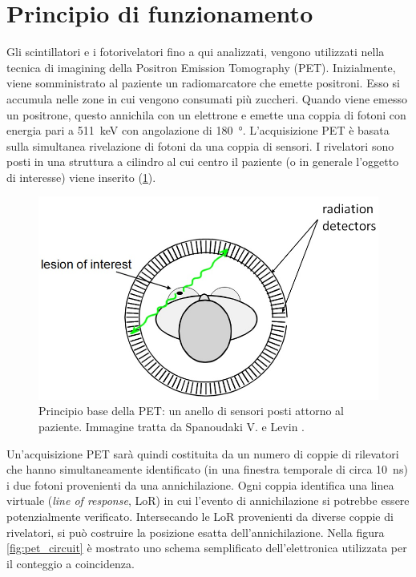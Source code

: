 \section{Principio di funzionamento}
Gli scintillatori e i fotorivelatori fino a qui analizzati, vengono utilizzati nella tecnica di imagining della Positron Emission Tomography (PET). Inizialmente, viene somministrato al paziente un radiomarcatore che emette positroni. Esso si accumula nelle zone in cui vengono consumati più zuccheri. Quando viene emesso un positrone, questo annichila con un elettrone e emette una coppia di fotoni con energia pari a \SI{511}{\kilo\electronvolt} con angolazione di \SI{180}{\degree}. L'acquisizione PET è basata sulla simultanea rivelazione di fotoni da una coppia di sensori. I rivelatori sono posti in una struttura a cilindro al cui centro il paziente (o in generale l'oggetto di interesse) viene inserito (\Fig\ref{fig:pet}).
\begin{figure}[tbh]
	\centering
	\includegraphics[width=0.6\linewidth]{./ImageFiles/PET.jpg}
	\caption{Principio base della PET: un anello di sensori posti attorno al paziente. Immagine tratta da Spanoudaki V. e Levin \cite{Spanoudaki2010}.}
	\label{fig:pet}
\end{figure} 
Un'acquisizione PET sarà quindi costituita da un numero di coppie di rilevatori che hanno simultaneamente identificato (in una finestra temporale di circa \SI{10}{\nano\second}) i due fotoni provenienti da una annichilazione. Ogni coppia identifica una linea virtuale (\textit{line of response}, LoR) in cui l'evento di annichilazione si potrebbe essere potenzialmente verificato. Intersecando le LoR provenienti da diverse coppie di rivelatori, si può costruire la posizione esatta dell'annichilazione. Nella figura \ref{fig:pet_circuit} è mostrato uno schema semplificato dell'elettronica utilizzata per il conteggio a coincidenza.
